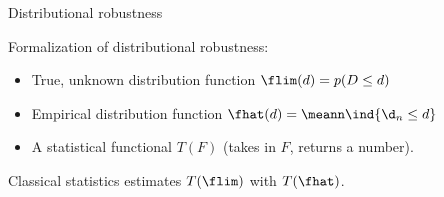 \begin{frame}[t]{Distributional robustness}

Formalization of distributional robustness:
%
\begin{itemize}
%
\item True, unknown distribution function $\flim(d) = p(D \le d)$
\item Empirical distribution function $\fhat(d) = \meann \ind{\d_n \le d}$
\item A statistical functional $T(F)$ (takes in $F$, returns a number).
%
\end{itemize}

Classical statistics estimates $T(\flim)$ with $T(\fhat)$.







    
\end{frame}




